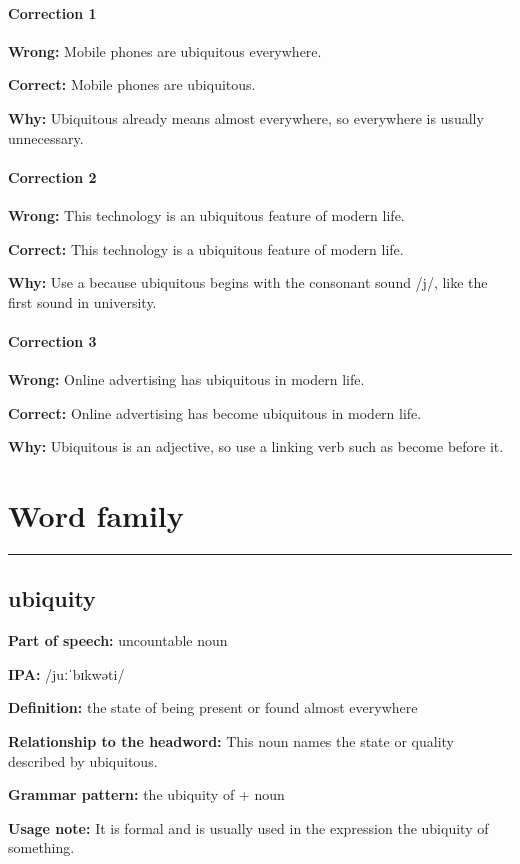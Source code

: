 \documentclass[11pt]{article}
\newcommand{\sectionrule}{\par\vspace{-0.5em}\noindent\textcolor{Accent}{\rule{\linewidth}{0.6pt}}\par}
\begin{document}
\paragraph{Correction 1}
\textbf{Wrong:} Mobile phones are ubiquitous everywhere.

\textbf{Correct:} Mobile phones are ubiquitous.

\textbf{Why:} Ubiquitous already means almost everywhere, so everywhere is usually unnecessary.

\paragraph{Correction 2}
\textbf{Wrong:} This technology is an ubiquitous feature of modern life.

\textbf{Correct:} This technology is a ubiquitous feature of modern life.

\textbf{Why:} Use a because ubiquitous begins with the consonant sound /j/, like the first sound in university.

\paragraph{Correction 3}
\textbf{Wrong:} Online advertising has ubiquitous in modern life.

\textbf{Correct:} Online advertising has become ubiquitous in modern life.

\textbf{Why:} Ubiquitous is an adjective, so use a linking verb such as become before it.

\section{Word family}
\sectionrule
\subsection{ubiquity}
\textbf{Part of speech:} uncountable noun

\textbf{IPA:} /juːˈbɪkwəti/

\textbf{Definition:} the state of being present or found almost everywhere

\textbf{Relationship to the headword:} This noun names the state or quality described by ubiquitous.

\textbf{Grammar pattern:} the ubiquity of + noun

\textbf{Usage note:} It is formal and is usually used in the expression the ubiquity of something.
\end{document}
